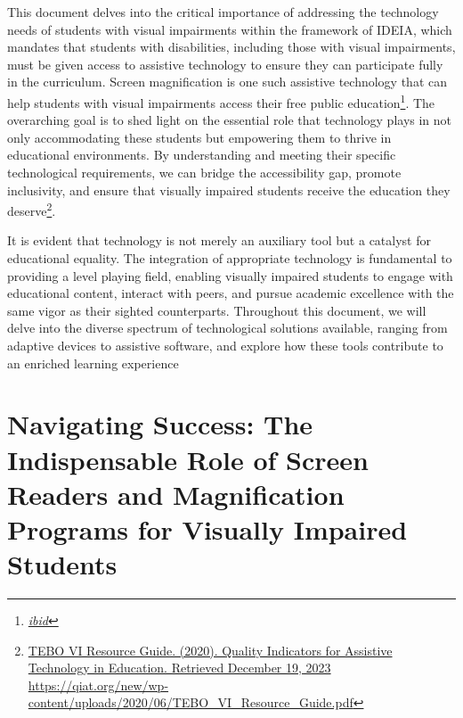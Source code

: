 \documentclass[12pt,letterpaper,twoside]{extreport}
\begin{document}
This document delves into the critical importance of addressing the technology needs of students with visual impairments within the framework of IDEIA, which mandates that students with disabilities, including those with visual impairments, must be given access to assistive technology to ensure they can participate fully in the curriculum. Screen magnification is one such assistive technology that can help students with visual impairments access their free public education\footnote{\raggedright \href{http://sites.ed.gov/idea/statuteregulations/}{\textit{ibid}}}. The overarching goal is to shed light on the essential role that technology plays in not only accommodating these students but empowering them to thrive in educational environments. By understanding and meeting their specific technological requirements, we can bridge the accessibility gap, promote inclusivity, and ensure that visually impaired students receive the education they deserve\footnote{\raggedright \href{https://qiat.org/new/wp-content/uploads/2020/06/TEBO_VI_Resource_Guide.pdf}{TEBO VI Resource Guide. (2020). Quality Indicators for Assistive Technology in Education. Retrieved December 19, 2023} \url{https://qiat.org/new/wp-content/uploads/2020/06/TEBO_VI_Resource_Guide.pdf}}.

It is evident that technology is not merely an auxiliary tool but a catalyst for educational equality. The integration of appropriate technology is fundamental to providing a level playing field, enabling visually impaired students to engage with educational content, interact with peers, and pursue academic excellence with the same vigor as their sighted counterparts. Throughout this document, we will delve into the diverse spectrum of technological solutions available, ranging from adaptive devices to assistive software, and explore how these tools contribute to an enriched learning experience

\pagebreak
\fancyhead[RO]{\textit{\lastxmark}}
\fancyhead[LE]{\textit{\firstxmark}}
\fancyfoot[C]{}

\hypertarget{vision-assistive-technology-laptop-computer-requirements}{}\chapter[\raggedright Navigating Success:  \\ The Indispensable Role of Screen Readers and Magnification\\ Programs for Visually Impaired Students]{Navigating Success: The Indispensable Role of Screen Readers and Magnification Programs for Visually Impaired Students}\label{vision-assistive-technology-laptop-computer-requirements}
\minitoc \newpage
\end{document}
